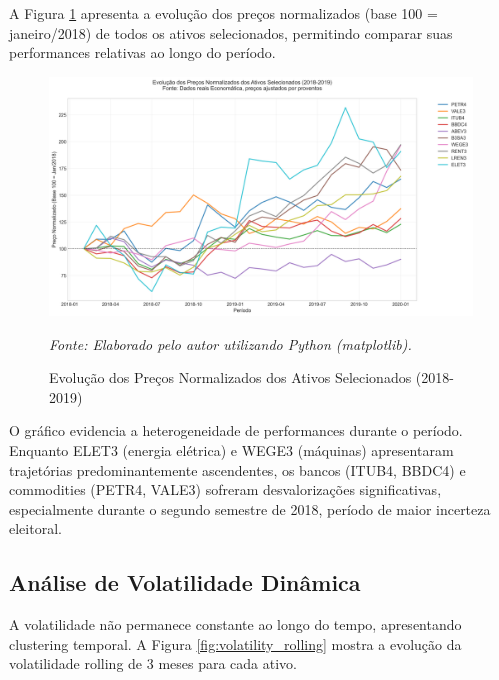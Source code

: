 A Figura \ref{fig:price_evolution} apresenta a evolução dos preços normalizados (base 100 = janeiro/2018) de todos os ativos selecionados, permitindo comparar suas performances relativas ao longo do período.

\begin{figure}[H]
\centering
\includegraphics[width=\textwidth]{images/price_evolution.png}
\caption{Evolução dos Preços Normalizados dos Ativos Selecionados (2018-2019)}
\textit{Fonte: Elaborado pelo autor utilizando Python (matplotlib).}
\label{fig:price_evolution}
\end{figure}

O gráfico evidencia a heterogeneidade de performances durante o período. Enquanto ELET3 (energia elétrica) e WEGE3 (máquinas) apresentaram trajetórias predominantemente ascendentes, os bancos (ITUB4, BBDC4) e commodities (PETR4, VALE3) sofreram desvalorizações significativas, especialmente durante o segundo semestre de 2018, período de maior incerteza eleitoral.

\subsection{Análise de Volatilidade Dinâmica}

A volatilidade não permanece constante ao longo do tempo, apresentando clustering temporal. A Figura \ref{fig:volatility_rolling} mostra a evolução da volatilidade rolling de 3 meses para cada ativo.

